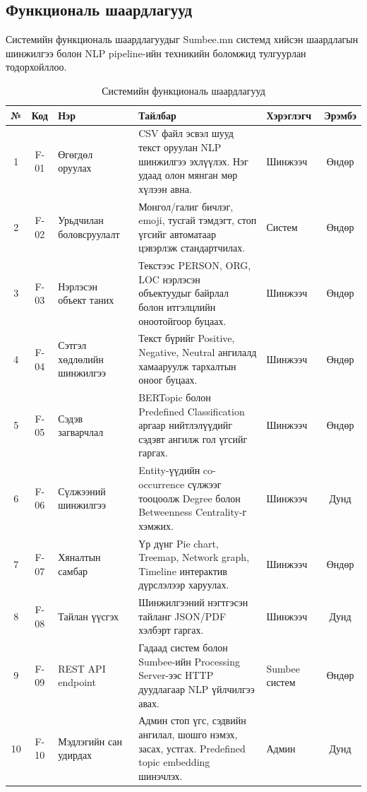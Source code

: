 \subsection{Функциональ шаардлагууд}

Системийн функциональ шаардлагуудыг Sumbee.mn системд хийсэн шаардлагын шинжилгээ болон NLP pipeline-ийн техникийн боломжид тулгуурлан тодорхойллоо. 
\begin{table}[h!]
\centering
\renewcommand{\arraystretch}{1.5}
\begin{tabular}{|c|c|p{2.5cm}|p{5cm}|p{1.8cm}|c|}
\hline
\textbf{№} & \textbf{Код} & \textbf{Нэр} & \textbf{Тайлбар} & \textbf{Хэрэглэгч} & \textbf{Эрэмбэ} \\ \hline
1 & F-01 & Өгөгдөл оруулах & CSV файл эсвэл шууд текст оруулан NLP шинжилгээ эхлүүлэх. Нэг удаад олон мянган мөр хүлээн авна. & Шинжээч & Өндөр \\ \hline
2 & F-02 & Урьдчилан боловсруулалт & Монгол/галиг бичлэг, emoji, тусгай тэмдэгт, стоп үгсийг автоматаар цэвэрлэж стандартчилах. & Систем & Өндөр \\ \hline
3 & F-03 & Нэрлэсэн объект таних & Текстээс PERSON, ORG, LOC нэрлэсэн объектуудыг байрлал болон итгэлцлийн оноотойгоор буцаах. & Шинжээч & Өндөр \\ \hline
4 & F-04 & Сэтгэл хөдлөлийн шинжилгээ & Текст бүрийг Positive, Negative, Neutral ангилалд хамааруулж тархалтын оноог буцаах. & Шинжээч & Өндөр \\ \hline
5 & F-05 & Сэдэв загварчлал & BERTopic болон Predefined Classification аргаар нийтлэлүүдийг сэдэвт ангилж гол үгсийг гаргах. & Шинжээч & Өндөр \\ \hline
6 & F-06 & Сүлжээний шинжилгээ & Entity-үүдийн co-occurrence сүлжээг тооцоолж Degree болон Betweenness Centrality-г хэмжих. & Шинжээч & Дунд \\ \hline
7 & F-07 & Хяналтын самбар & Үр дүнг Pie chart, Treemap, Network graph, Timeline интерактив дүрслэлээр харуулах. & Шинжээч & Өндөр \\ \hline
8 & F-08 & Тайлан үүсгэх & Шинжилгээний нэгтгэсэн тайланг JSON/PDF хэлбэрт гаргах. & Шинжээч & Дунд \\ \hline
9 & F-09 & REST API endpoint & Гадаад систем болон Sumbee-ийн Processing Server-ээс HTTP дуудлагаар NLP үйлчилгээ авах. & Sumbee систем & Өндөр \\ \hline
10 & F-10 & Мэдлэгийн сан удирдах & Админ стоп үгс, сэдвийн ангилал, шошго нэмэх, засах, устгах. Predefined topic embedding шинэчлэх. & Админ & Дунд \\ \hline
\end{tabular}
\caption{Системийн функциональ шаардлагууд}
\label{tab:functional_req}
\end{table}

